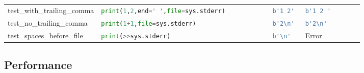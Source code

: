 \begin{table}[ht]
\begin{tabular}{@{}l|lll@{}}
    test\_with\_trailing\_comma           & \lstinline[language=Python, style=pythonstyle]|print(1,2,end=' ',file=sys.stderr)           | & \lstinline[language=Python, style=pythonstyle]|b'1 2'|                                 & \lstinline[language=Python, style=pythonstyle]|b'1 2 '       |                \\
    test\_no\_trailing\_comma             & \lstinline[language=Python, style=pythonstyle]|print(1+1,file=sys.stderr)                   | & \lstinline[language=Python, style=pythonstyle]|b'2\n' |                 & \lstinline[language=Python, style=pythonstyle]|b'2\n'        | \\
    test\_spaces\_before\_file            & \lstinline[language=Python, style=pythonstyle]|print(>>sys.stderr)| & \lstinline[language=Python, style=pythonstyle]|b'\n'|                   & Error                         \\ \bottomrule
    \end{tabular}
\end{table}

\subsection{Performance}

